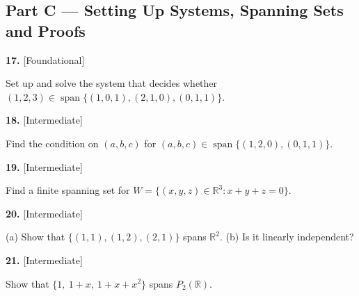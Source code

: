 \documentclass[11pt]{article}
\begin{document}
\subsection*{\normalsize\color{ink} Part C --- Setting Up Systems, Spanning Sets and Proofs}
\begin{minipage}{\linewidth}\textbf{17.} \hfill{\scriptsize\color{ink}[Foundational]}\par\nopagebreak Set up and solve the system that decides whether $(1,2,3)\in\operatorname{span}\{(1,0,1),(2,1,0),(0,1,1)\}$.
\vspace{4.6cm}\end{minipage}\par\vspace{4pt}
\begin{minipage}{\linewidth}\textbf{18.} \hfill{\scriptsize\color{ink}[Intermediate]}\par\nopagebreak Find the condition on $(a,b,c)$ for $(a,b,c)\in\operatorname{span}\{(1,2,0),(0,1,1)\}$.
\vspace{4.4cm}\end{minipage}\par\vspace{4pt}
\begin{minipage}{\linewidth}\textbf{19.} \hfill{\scriptsize\color{ink}[Intermediate]}\par\nopagebreak Find a finite spanning set for $W=\{(x,y,z)\in\mathbb{R}^{3}:x+y+z=0\}$.
\vspace{4.4cm}\end{minipage}\par\vspace{4pt}
\begin{minipage}{\linewidth}\textbf{20.} \hfill{\scriptsize\color{ink}[Intermediate]}\par\nopagebreak (a) Show that $\{(1,1),(1,2),(2,1)\}$ spans $\mathbb{R}^{2}$. (b) Is it linearly independent?
\vspace{5.0cm}\end{minipage}\par\vspace{4pt}
\begin{minipage}{\linewidth}\textbf{21.} \hfill{\scriptsize\color{ink}[Intermediate]}\par\nopagebreak Show that $\{1,\ 1+x,\ 1+x+x^{2}\}$ spans $P_{2}(\mathbb{R})$.
\vspace{4.6cm}\end{minipage}\par\vspace{4pt}
\end{document}
